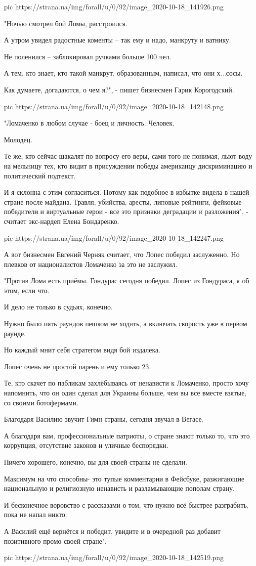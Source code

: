 \ifcmt
pic https://strana.ua/img/forall/u/0/92/image_2020-10-18_141926.png
\fi

"Ночью смотрел бой Ломы, расстроился.

А утром увидел радостные коменты – так ему и надо, манкруту и ватнику.

Не поленился – заблокировал ручками больше 100 чел.

А тем, кто знает, кто такой манкрут, образованным, написал, что они х...сосы.

Как думаете, догадаются, о чем я?", - пишет бизнесмен Гарик Корогодский. 

\ifcmt
pic https://strana.ua/img/forall/u/0/92/image_2020-10-18_142148.png
\fi

"Ломаченко в любом случае - боец и личность. Человек.

Молодец.

Те же, кто сейчас шакалят по вопросу его веры, сами того не понимая, льют воду
на мельницу тех, кто видит в присуждении победы американцу дискриминацию и
политический подтекст.

И я склонна с этим согласиться. Потому как подобное в избытке видела в нашей
стране после майдана. Травля, убийства, аресты, липовые рейтинги, фейковые
победители и виртуальные герои - все это признаки деградации и разложения", -
считает экс-нардеп Елена Бондаренко.

\ifcmt
pic https://strana.ua/img/forall/u/0/92/image_2020-10-18_142247.png
\fi

А вот бизнесмен Евгений Черняк считает, что Лопес победил заслуженно. Но
плевков от националистов Ломаченко за это не заслужил.

"Против Лома есть приёмы. Гондурас сегодня победил. Лопес из Гондураса, я об
этом, если что.

И дело не только в судьях, конечно.

Нужно было пять раундов пешком не ходить, а включать скорость уже в первом
раунде.

Но каждый мнит себя стратегом видя бой издалека.

Лопес очень не простой парень и ему только 23.

Те, кто скачет по пабликам захлёбываясь от ненависти к Ломаченко, просто хочу
напомнить, что он один сделал для Украины больше, чем вы все вместе взятые, со
своими ботофермами.

Благодаря Василию звучит Гимн страны, сегодня звучал в Вегасе.

А благодаря вам, профессиональные патриоты, о стране знают только то, что это
коррупция, отсутствие законов и уличные беспорядки.

Ничего хорошего, конечно, вы для своей страны не сделали.

Максимум на что способны- это тупые комментарии в Фейсбуке, разжигающие
национальную и религиозную ненависть и разламывающие пополам страну.

И бесконечное воровство с рассказами о том, что нужно всё быстрее разграбить,
пока не напал никто.

А Василий ещё вернётся и победит, увидите и в очередной раз добавит позитивного
промо своей стране".

\ifcmt
pic https://strana.ua/img/forall/u/0/92/image_2020-10-18_142519.png
\fi
